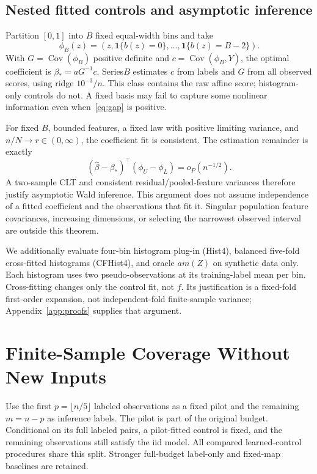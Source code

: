 \documentclass{article}
\newcommand{\Cov}{\operatorname{Cov}}
\newcommand{\ind}{\mathbf{1}}
\begin{document}
\subsection{Nested fitted controls and asymptotic inference}
Partition $[0,1]$ into $B$ fixed equal-width bins and take
\[
 \phi_B(z)=(z,\ind\{b(z)=0\},\ldots,\ind\{b(z)=B-2\}).
\]
With $G=\Cov(\phi_B)$ positive definite and $c=\Cov(\phi_B,Y)$, the optimal coefficient is $\beta_*=aG^{-1}c$. Series$B$ estimates $c$ from labels and $G$ from all observed scores, using ridge $10^{-3}/n$. This class contains the raw affine score; histogram-only controls do not. A fixed basis may fail to capture some nonlinear information even when~\eqref{eq:gap} is positive.

For fixed $B$, bounded features, a fixed law with positive limiting variance, and $n/N\to r\in(0,\infty)$, the coefficient fit is consistent. The estimation remainder is exactly
\begin{equation}
 (\widehat\beta-\beta_*)^\top
 (\overline\phi_U-\overline\phi_L)=o_P(n^{-1/2}).
 \label{eq:rem}
\end{equation}
A two-sample CLT and consistent residual/pooled-feature variances therefore justify asymptotic Wald inference. This argument does not assume independence of a fitted coefficient and the observations that fit it. Singular population feature covariances, increasing dimensions, or selecting the narrowest observed interval are outside this theorem.

We additionally evaluate four-bin histogram plug-in (Hist4), balanced five-fold cross-fitted histograms (CFHist4), and oracle $am(Z)$ on synthetic data only. Each histogram uses two pseudo-observations at its training-label mean per bin. Cross-fitting changes only the control fit, not $f$. Its justification is a fixed-fold first-order expansion, not independent-fold finite-sample variance; Appendix~\ref{app:proofs} supplies that argument.

\section{Finite-Sample Coverage Without New Inputs}
\label{sec:exact}
Use the first $p=\lfloor n/5\rfloor$ labeled observations as a fixed pilot and the remaining $m=n-p$ as inference labels. The pilot is part of the original budget. Conditional on its full labeled pairs, a pilot-fitted control is fixed, and the remaining observations still satisfy the iid model. All compared learned-control procedures share this split. Stronger full-budget label-only and fixed-map baselines are retained.
\end{document}
